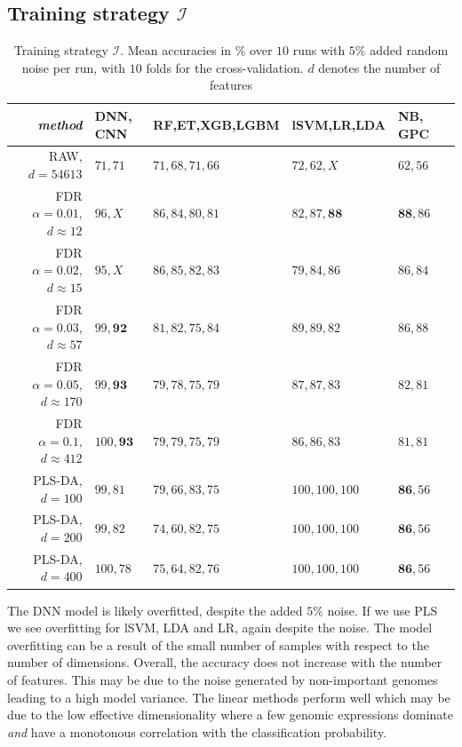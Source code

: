 \documentclass[a4paper,10pt]{article}
\begin{document}
\subsection{Training strategy $\mathcal{I}$}
%
\begin{table}[htp]
\centering
\begin{tabular}{rlllll}

\textit{method}						& DNN, CNN 		& RF,ET,XGB,LGBM	&  lSVM,LR,LDA		& NB, GPC  			\\
							\hline
RAW, $d=54613$ 						& $71, 71$	 	&  $71, 68, 71, 66$	&  $72, 62, X$		&  $62, 56$  			\\
FDR $\alpha=0.01$, $d\approx 12$ 	& $96, X$  		&  $86, 84, 80, 81$	&  $82, 87, \mathbf{88}$&  $\mathbf{88}, 86$  		\\
FDR $\alpha=0.02$, $d\approx 15$ 	& $95, X$	  	&  $86, 85, 82, 83$	&  $79, 84, 86$		&  $86, 84$			\\
FDR $\alpha=0.03$, $d\approx 57$ 	& $99, \mathbf{92}$  	&  $81, 82, 75, 84$	&  $89, 89, 82$		&  $86, 88$			\\
FDR $\alpha=0.05$, $d\approx 170$ 	& $99, \mathbf{93}$  	&  $79, 78, 75, 79$	&  $87, 87, 83$		&  $82, 81$			\\
FDR $\alpha=0.1$,  $d\approx 412$ 	& $100,\mathbf{93}$	&  $79, 79, 75, 79$	&  $86, 86, 83$		&  $81, 81$			\\
PLS-DA, $d=100$ 					& $99, 81$		&  $79, 66, 83, 75$	&  $100, 100, 100$	&  $\mathbf{86}, 56$		\\
PLS-DA, $d=200$ 					& $99, 82$		&  $74, 60, 82, 75$	&  $100, 100, 100$  	&  $\mathbf{86}, 56$		\\
PLS-DA, $d=400$ 					& $100, 78$		&  $75, 64, 82, 76$	&  $100, 100, 100$  	&  $\mathbf{86}, 56$		
\end{tabular}
\caption{Training strategy $\mathcal{I}$. Mean accuracies in $\%$ over $10$ runs with $5\%$ added random noise per run, with $10$ folds for the cross-validation. $d$ denotes the number of features}
\label{tab:diversitymetrics}
\end{table}
%
The DNN model is likely overfitted, despite the added $5\%$ noise. If we use PLS we see overfitting for lSVM, LDA and LR, again despite the noise.
The model overfitting can be a result of the small number of samples with respect to the number of dimensions. Overall, the accuracy does not increase 
with the number of features. This may be due to the noise generated by non-important genomes leading to a high model variance. The linear methods perform well
which may be due to the low effective dimensionality where a few genomic expressions dominate \textit{and} have a monotonous correlation with the classification probability. \\ \\
\end{document}

